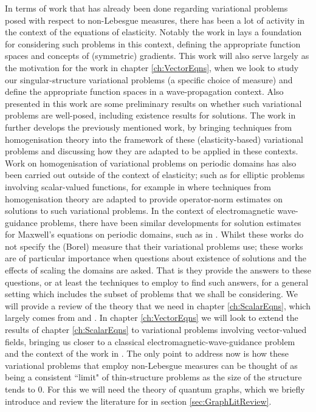 In terms of work that has already been done regarding variational problems posed with respect to non-Lebesgue measures, there has been a lot of activity in the context of the equations of elasticity.
Notably the work in \cite{zhikov2000extension} lays a foundation for considering such problems in this context, defining the appropriate function spaces and concepts of (symmetric) gradients.
This work will also serve largely as the motivation for the work in chapter \ref{ch:VectorEqns}, when we look to study our singular-structure variational problems (a specific choice of measure) and define the appropriate function spaces in a wave-propagation context.
Also presented in this work are some preliminary results on whether such variational problems are well-posed, including existence results for solutions.
The work in \cite{zhikov2002homogenization} further develops the previously mentioned work, by bringing techniques from homogenisation theory into the framework of these (elasticity-based) variational problems and discussing how they are adapted to be applied in these contexts. 
Work on homogenisation of variational problems on periodic domains has also been carried out outside of the context of elasticity; such as for elliptic problems involving scalar-valued functions, for example in \cite{cherednichenko2018elliptic} where techniques from homogenisation theory are adapted to provide operator-norm estimates on solutions to such variational problems. 
In the context of electromagnetic wave-guidance problems, there have been similar developments for solution estimates for Maxwell's equations on periodic domains, such as in \cite{cherednichenko2018maxwell}.
Whilst these works do not specify the (Borel) measure that their variational problems use; these works are of particular importance when questions about existence of solutions and the effects of scaling the domains are asked.
That is they provide the answers to these questions, or at least the techniques to employ to find such answers, for a general setting which includes the subset of problems that we shall be considering.
We will provide a review of the theory that we need in chapter \ref{ch:ScalarEqns}, which largely comes from \cite{zhikov2000extension} and \cite{cherednichenko2018elliptic}.
In chapter \ref{ch:VectorEqns} we will look to extend the results of chapter \ref{ch:ScalarEqns} to variational problems involving vector-valued fields, bringing us closer to a classical electromagnetic-wave-guidance problem and the context of the work in \cite{cherednichenko2018maxwell}.
The only point to address now is how these variational problems that employ non-Lebesgue measures can be thought of as being a consistent ``limit" of thin-structure problems as the size of the structure tends to 0.
For this we will need the theory of quantum graphs, which we briefly introduce and review the literature for in section \ref{sec:GraphLitReview}.

